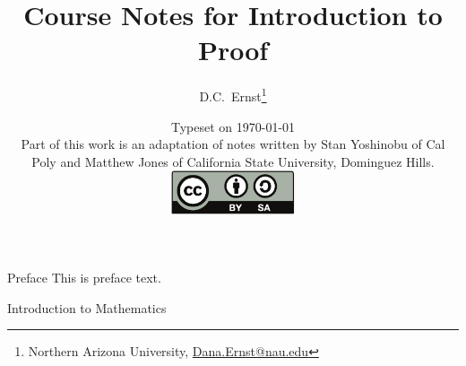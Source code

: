 \documentclass[letterpaper,11pt,onesided]{book}%
\theoremstyle{problem}
\theoremstyle{definition}
\let\origdoublepage\cleardoublepage
\newcommand{\clearemptydoublepage}{%
  \clearpage
  {\pagestyle{empty}\origdoublepage}%
}
\begin{document}
\frontmatter
\title{Course Notes for Introduction to Proof}
\author{D.C.~Ernst\thanks{Northern Arizona University, \url{Dana.Ernst@nau.edu}}}
\date{Typeset on \today\\
\vfill
  Part of this work is an adaptation of notes written by Stan Yoshinobu of Cal Poly and Matthew Jones of California State University, Dominguez Hills.
\vfill
\includegraphics[height=1.3cm]{by-sa}
\vfill}
\maketitle
 \thispagestyle{empty}








\tableofcontents
\clearemptydoublepage

\begin{chapter}{Preface}
This is preface text.
\end{chapter}

\clearemptydoublepage

\mainmatter

\begin{chapter}{Introduction to Mathematics}

\addtocounter{theorem}{-1}


\addtocounter{theorem}{1}


%
\end{chapter}
\end{document}
